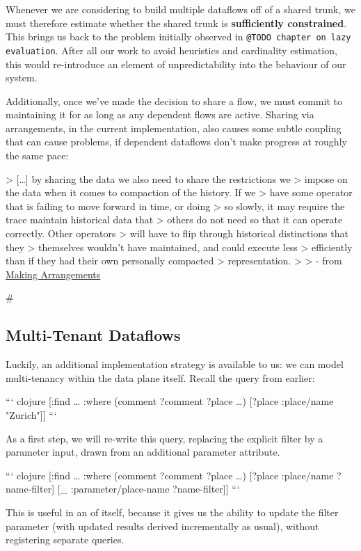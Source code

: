 \documentclass[../catalog.tex]{subfiles}
\begin{document}
Whenever we are considering to build multiple dataflows off of a
shared trunk, we must therefore estimate whether the shared trunk is
\textbf{sufficiently constrained}. This brings us back to the problem
initially observed in \texttt{@TODO chapter on lazy evaluation}. After all
our work to avoid heuristics and cardinality estimation, this would
re-introduce an element of unpredictability into the behaviour of our
system.

Additionally, once we've made the decision to share a flow, we must
commit to maintaining it for as long as any dependent flows are
active. Sharing via arrangements, in the current implementation, also
causes some subtle coupling that can cause problems, if dependent
dataflows don't make progress at roughly the same pace:

> [\ldots{}] by sharing the data we also need to share the restrictions we
> impose on the data when it comes to compaction of the history. If we
> have some operator that is failing to move forward in time, or doing
> so slowly, it may require the trace maintain historical data that
> others do not need so that it can operate correctly. Other operators
> will have to flip through historical distinctions that they
> themselves wouldn't have maintained, and could execute less
> efficiently than if they had their own personally compacted
> representation.
> 
> - from \href{https://github.com/frankmcsherry/blog/blob/master/posts/2017-05-01.md}{Making Arrangements}

\#\subsection{Multi-Tenant Dataflows}

Luckily, an additional implementation strategy is available to us: we
can model multi-tenancy within the data plane itself. Recall the query
from earlier:

``` clojure
[:find \ldots{}
 :where
 (comment ?comment ?place \ldots{})
 [?place :place/name "Zurich"]]
```

As a first step, we will re-write this query, replacing the explicit
filter by a parameter input, drawn from an additional parameter
attribute.

``` clojure
[:find \ldots{}
 :where
 (comment ?comment ?place \ldots{})
 [?place :place/name ?name-filter]
 [\_ :parameter/place-name ?name-filter]]
```

This is useful in an of itself, because it gives us the ability to
update the filter parameter (with updated results derived
incrementally as usual), without registering separate queries.
\end{document}
